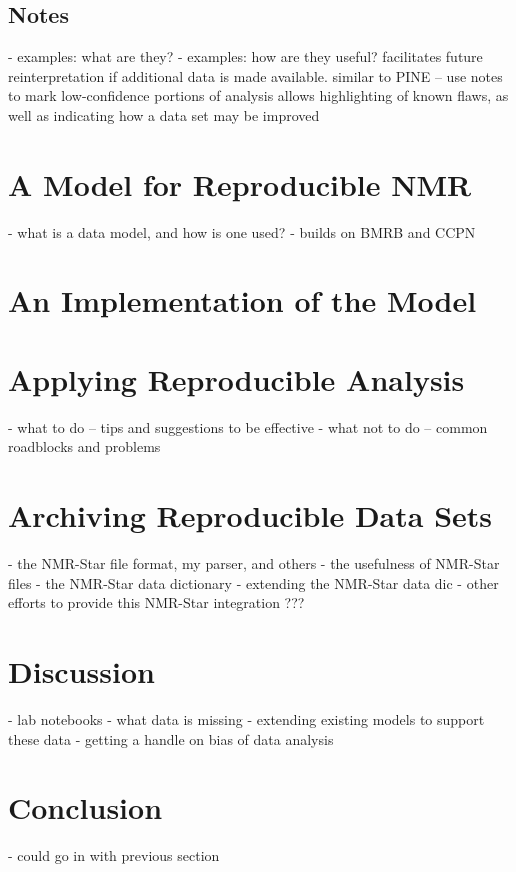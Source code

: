 \subsection{Notes}
 - examples: what are they?
 - examples: how are they useful?  facilitates future reinterpretation if
   additional data is made available.  similar to PINE -- use notes to mark
   low-confidence portions of analysis
   allows highlighting of known flaws, as well as indicating how a data set
   may be improved


\section{A Model for Reproducible NMR}
 - what is a data model, and how is one used?
 - builds on BMRB and CCPN


\section{An Implementation of the Model}


\section{Applying Reproducible Analysis}
 - what to do -- tips and suggestions to be effective
 - what not to do -- common roadblocks and problems


\section{Archiving Reproducible Data Sets}
 - the NMR-Star file format, my parser, and others
 - the usefulness of NMR-Star files
 - the NMR-Star data dictionary
 - extending the NMR-Star data dic
 - other efforts to provide this NMR-Star integration ???


\section{Discussion}
 - lab notebooks
 - what data is missing
 - extending existing models to support these data
 - getting a handle on bias of data analysis


\section{Conclusion}
 - could go in with previous section

